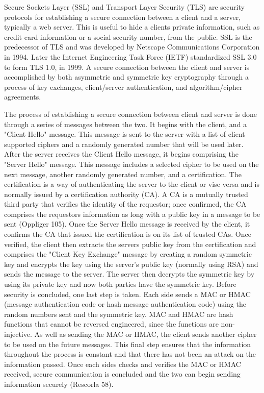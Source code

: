 Secure Sockets Layer (SSL) and Transport Layer Security (TLS) are security
protocols for establishing a secure connection between a client and a server,
typically a web server.  This is useful to hide a clients private information,
such as credit card information or a social security number, from the public.
SSL is the predecessor of TLS and was developed by Netscape Communications
Corporation in 1994.  Later the Internet Engineering Task Force (IETF)
standardized SSL 3.0 to form TLS 1.0, in 1999.  A secure connection between the
client and server is accomplished by both asymmetric and symmetric key
cryptography through a process of key exchanges, client/server authentication,
and algorithm/cipher agreements.

The process of establishing a secure connection between client and server is
done through a series of messages between the two.  It begins with the client,
and a "Client Hello" message.  This message is sent to the server with a list
of client supported ciphers and a randomly generated number that will be used
later.  After the server receives the Client Hello message, it begins
comprising the "Server Hello" message.  This message includes a selected cipher
to be used on the next message, another randomly generated number, and a
certification.  The certification is a way of authenticating the server to the
client or vise versa and is normally issued by a certification authority (CA).
A CA is a mutually trusted third party that verifies the identity of the
requestor; once confirmed, the CA comprises the requestors information as long
with a public key in a message to be sent (Oppliger 105).  Once the Server
Hello message is received by the client, it confirms the CA that issued the
certification is on its list of trusted CAs.  Once verified, the client then
extracts the servers public key from the certification and comprises the
"Client Key Exchange" message by creating a random symmetric key and encrypts
the key using the server's public key (normally using RSA) and sends the
message to the server.  The server then decrypts the symmetric key by using its
private key and now both parties have the symmetric key.  Before security is
concluded, one last step is taken.  Each side sends a MAC or HMAC (message
authentication code or hash message authentication code) using the random
numbers sent and the symmetric key.  MAC and HMAC are hash functions that
cannot be reversed engineered, since the functions are non-injective.  As well
as sending the MAC or HMAC, the client sends another cipher to be used on the
future messages.  This final step ensures that the information throughout the
process is constant and that there has not been an attack on the information
passed.  Once each sides checks and verifies the MAC or HMAC received, secure
communication is concluded and the two can begin sending information securely
(Rescorla 58).   

